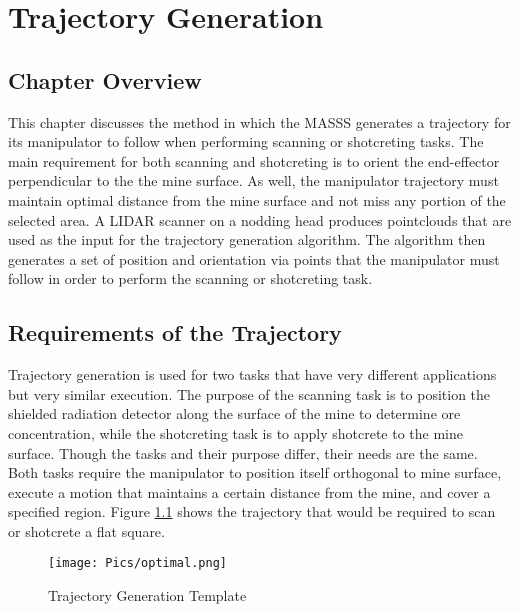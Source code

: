 \chapter{Trajectory Generation}
\label{chap:traj}
\section{Chapter Overview}
This chapter discusses the method in which the MASSS generates a trajectory for its manipulator to follow when performing scanning or shotcreting tasks. The main requirement for both scanning and shotcreting is to orient the end-effector perpendicular to the the mine surface. As well, the manipulator trajectory must maintain optimal distance from the mine surface and not miss any portion of the selected area. A LIDAR scanner on a nodding head produces pointclouds that are used as the input for the trajectory generation algorithm. The algorithm then generates a set of position and orientation via points that the manipulator must follow in order to perform the scanning or shotcreting task.\\

\section{Requirements of the Trajectory}

Trajectory generation is used for two tasks that have very different applications but very similar execution. The purpose of the scanning task is to position the shielded radiation detector along the surface of the mine to determine ore concentration, while the shotcreting task is to apply shotcrete to the mine surface. Though the tasks and their purpose differ, their needs are the same. Both tasks require the manipulator to position itself orthogonal to mine surface, execute a motion that maintains a certain distance from the mine, and cover a specified region. Figure \ref{fig:idealspray} shows the trajectory that would be required to scan or shotcrete a flat square.\\

\begin{figure}[h]
    \centering
    \texttt{[image: Pics/optimal.png]}
    \caption{Trajectory Generation Template}
    \label{fig:idealspray}
\end{figure}

